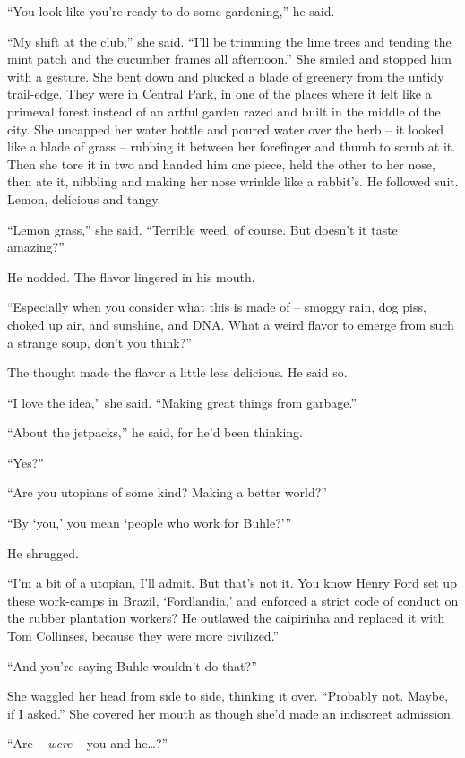 “You look like you're ready to do some gardening,” he said.

“My shift at the club,” she said. “I'll be trimming the lime 
trees and tending the mint patch and the cucumber frames all 
afternoon.” She smiled and stopped him with a gesture. She bent down 
and plucked a blade of greenery from the untidy trail-edge. They were 
in Central Park, in one of the places where it felt like a primeval 
forest instead of an artful garden razed and built in the middle of the 
city. She uncapped her water bottle and poured water over the herb -- 
it looked like a blade of grass -- rubbing it between her forefinger 
and thumb to scrub at it. Then she tore it in two and handed him one 
piece, held the other to her nose, then ate it, nibbling and making her 
nose wrinkle like a rabbit's. He followed suit. Lemon, delicious and 
tangy.

“Lemon grass,” she said. “Terrible weed, of course. But doesn't 
it taste amazing?”

He nodded. The flavor lingered in his mouth.

“Especially when you consider what this is made of -- smoggy rain, 
dog piss, choked up air, and sunshine, and DNA. What a weird flavor to 
emerge from such a strange soup, don't you think?”

The thought made the flavor a little less delicious. He said so.

“I love the idea,” she said. “Making great things from garbage.”

“About the jetpacks,” he said, for he'd been thinking.

“Yes?”

“Are you utopians of some kind? Making a better world?”

“By `you,' you mean `people who work for Buhle?'”

He shrugged.

“I'm a bit of a utopian, I'll admit. But that's not it. You know 
Henry Ford set up these work-camps in Brazil, `Fordlandia,' and 
enforced a strict code of conduct on the rubber plantation workers? He 
outlawed the caipirinha and replaced it with Tom Collinses, because 
they were more civilized.”

“And you're saying Buhle wouldn't do that?”

She waggled her head from side to side, thinking it over. “Probably 
not. Maybe, if I asked.” She covered her mouth as though she'd made 
an indiscreet admission.

“Are -- \emph{were} -- you and he\ldots{}?”

